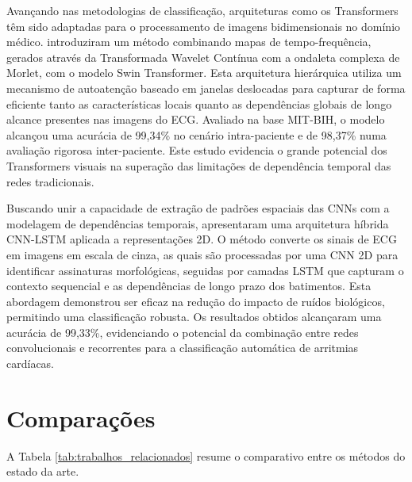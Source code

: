 Avançando nas metodologias de classificação, arquiteturas como os Transformers têm sido adaptadas para o processamento de imagens bidimensionais no 
domínio médico.  introduziram um método combinando mapas de tempo-frequência, gerados através da Transformada Wavelet Contínua 
com a ondaleta complexa de Morlet, com o modelo Swin Transformer. Esta arquitetura hierárquica utiliza um mecanismo de autoatenção baseado em 
janelas deslocadas para capturar de forma eficiente tanto as características locais quanto as dependências globais de longo alcance presentes nas 
imagens do ECG. Avaliado na base MIT-BIH, o modelo alcançou uma acurácia de 99,34\% no cenário intra-paciente e de 98,37\% numa avaliação rigorosa 
inter-paciente. Este estudo evidencia o grande potencial dos Transformers visuais na superação das limitações de dependência temporal das redes 
tradicionais.

Buscando unir a capacidade de extração de padrões espaciais das CNNs com a modelagem de dependências temporais,  apresentaram 
uma arquitetura híbrida CNN-LSTM aplicada a representações 2D. O método converte os sinais de ECG em imagens em escala de cinza, as quais são processadas 
por uma CNN 2D para identificar assinaturas morfológicas, seguidas por camadas LSTM que capturam o contexto sequencial e as dependências de longo prazo 
dos batimentos. Esta abordagem demonstrou ser eficaz na redução do impacto de ruídos biológicos, permitindo uma classificação robusta. Os resultados 
obtidos alcançaram uma acurácia de 99,33\%, evidenciando o potencial da combinação entre redes convolucionais e recorrentes para a classificação 
automática de arritmias cardíacas.

\section{Comparações}

A Tabela \ref{tab:trabalhos_relacionados} resume o comparativo entre os métodos do estado da arte.

